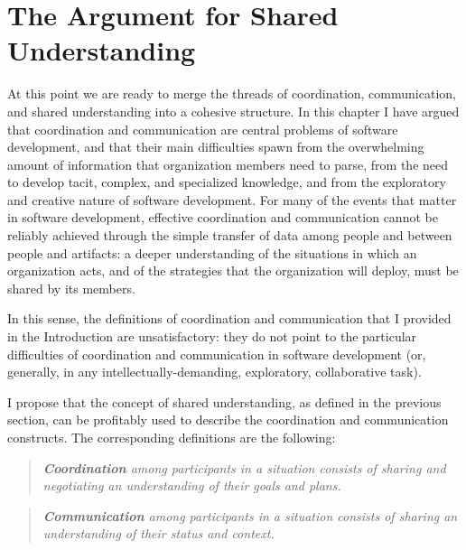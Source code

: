 \section{The Argument for Shared Understanding}
\label{sec:Argument}
\label{sec:SUTheory}


At this point we are ready to merge the threads of coordination, communication, and shared understanding into a cohesive structure. In this chapter I have argued that coordination and communication are central problems of software development, and that their main difficulties spawn from the overwhelming amount of information that organization members need to parse, from the need to develop tacit, complex, and specialized knowledge, and from the exploratory and creative nature of software development. For many of the events that matter in software development, effective coordination and communication cannot be reliably achieved through the simple transfer of data among people and between people and artifacts: a deeper understanding of the situations in which an organization acts, and of the strategies that the organization will deploy, must be shared by its members.

In this sense, the definitions of coordination and communication that I provided in the Introduction are unsatisfactory: they do not point to the particular difficulties of coordination and communication in software development (or, generally, in any intellectually-demanding, exploratory, collaborative task).

I propose that the concept of shared understanding, as defined in the previous section, can be profitably used to describe the coordination and communication constructs. The corresponding definitions are the following:

\begin{quote}
\emph{\textbf{Coordination} among participants in a situation consists of sharing and negotiating an understanding of their goals and plans.}
\end{quote}
 
\begin{quote}
\emph{\textbf{Communication} among participants in a situation consists of sharing an understanding of their status and context.}
\end{quote}

